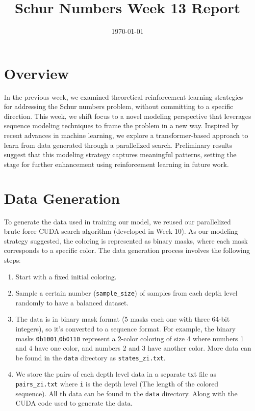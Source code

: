 \documentclass[12pt]{article}
\begin{document}
\title{Schur Numbers Week 13 Report}
\date{\today}

\tableofcontents
\newpage
\maketitle
\section{Overview}
In the previous week, we examined theoretical reinforcement learning strategies for addressing the Schur numbers problem, without committing to a specific direction. This week, we shift focus to a novel modeling perspective that leverages sequence modeling techniques to frame the problem in a new way. Inspired by recent advances in machine learning, we explore a transformer-based approach to learn from data generated through a parallelized search. Preliminary results suggest that this modeling strategy captures meaningful patterns, setting the stage for further enhancement using reinforcement learning in future work.

\section{Data Generation}
To generate the data used in training our model, we reused our parallelized brute-force CUDA search algorithm (developed in Week 10). As our modeling strategy suggested, the coloring is represented as binary masks, where each mask corresponds to a specific color. The data generation process involves the following steps:
\begin{enumerate}
    \item Start with a fixed initial coloring.
    \item Sample a certain number (\texttt{sample\_size}) of samples from each depth level randomly to have a balanced dataset.
    \item The data is in binary mask format (5 masks each one with three 64-bit integers), so it's converted to a sequence format. For example, the binary masks \texttt{0b1001},\texttt{0b0110} represent a 2-color coloring of size 4 where numbers 1 and 4 have one color, and numbers 2 and 3 have another color. More data can be found in the \texttt{data} directory as \texttt{states\_z{i}.txt}.
    \item We store the pairs of each depth level data in a separate txt file as \texttt{pairs\_z{i}.txt} where \texttt{i} is the depth level (The length of the colored sequence). All th data can be found in the \texttt{data} directory. Along with the CUDA code used to generate the data.
\end{enumerate}
\end{document}
